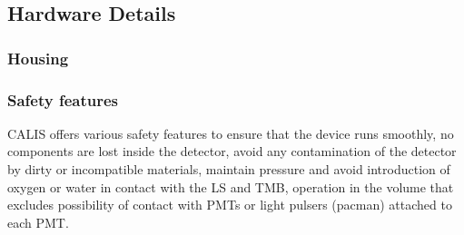 \subsection{Hardware Details}

\subsubsection{Housing}
 
\subsubsection{Safety features}
CALIS offers various safety features to ensure that the device runs smoothly, no components are lost inside the detector, avoid any contamination of the detector by dirty or incompatible materials, maintain pressure and avoid introduction of oxygen or water in contact with the LS and TMB, operation in the volume that excludes possibility of contact with PMTs or light pulsers (pacman) attached to each PMT.

